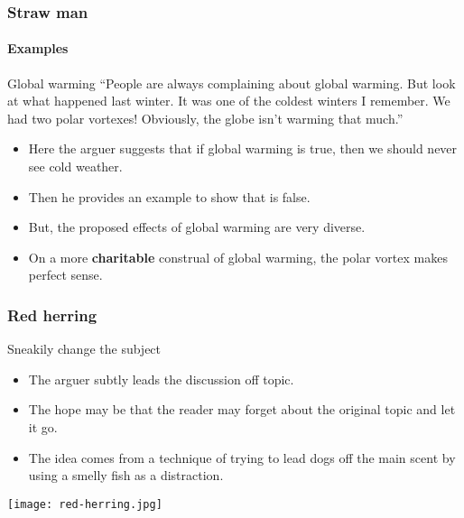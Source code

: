 \documentclass[10pt,letterpaper,xcolor=dvipsnames]{beamer}
\begin{document}
\begin{frame}
  \frametitle{Straw man}
  \framesubtitle{Examples}
  
  \begin{block}{Global warming}
    ``People are always complaining about global warming.  But look at what happened last winter.  It was one of the coldest winters I remember. We had two polar vortexes!  Obviously, the globe isn't warming that much.''
  \end{block}
  
  \begin{itemize}
    \item<2-> Here the arguer suggests that if global warming is true, then we should never see cold weather.
    \item<2-> Then he provides an example to show that is false.
    \item<2-> But, the proposed effects of global warming are very diverse.
    \item<2-> On a more \textbf{charitable} construal of global warming, the polar vortex makes perfect sense. 
  \end{itemize}  
  
\end{frame}

\begin{frame}
  \frametitle{Red herring}
  
  \begin{block}{Sneakily change the subject}
    \begin{itemize}
      \item The arguer subtly leads the discussion off topic.
      \item The hope may be that the reader may forget about the original topic and let it go.
      \item The idea comes from a technique of trying to lead dogs off the main scent by using a smelly fish as a distraction.
    \end{itemize}
  \end{block}
  
  \begin{center}
    \texttt{[image: red-herring.jpg]}
  \end{center}
  
\end{frame}
\end{document}
